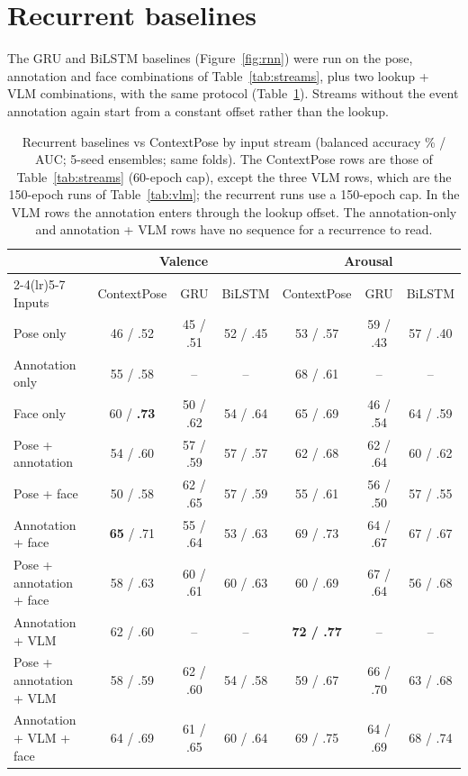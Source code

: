 \documentclass[11pt]{article}
\newcommand{\best}[1]{\textbf{#1}}
\begin{document}
\section{Recurrent baselines}\label{sec:baselines}

The GRU and BiLSTM baselines (Figure~\ref{fig:rnn}) were run on the pose, annotation and face combinations of Table~\ref{tab:streams}, plus two lookup + VLM combinations, with the same protocol (Table~\ref{tab:rnn}). Streams without the event annotation again start from a constant offset rather than the lookup.

\begin{table}[h]
\centering
\caption{Recurrent baselines vs ContextPose by input stream (balanced accuracy \% / AUC; 5-seed ensembles; same folds). The ContextPose rows are those of Table~\ref{tab:streams} (60-epoch cap), except the three VLM rows, which are the 150-epoch runs of Table~\ref{tab:vlm}; the recurrent runs use a 150-epoch cap. In the VLM rows the annotation enters through the lookup offset. The annotation-only and annotation + VLM rows have no sequence for a recurrence to read.}
\label{tab:rnn}
\small
\begin{tabular}{lcccccc}
\toprule
 & \multicolumn{3}{c}{Valence} & \multicolumn{3}{c}{Arousal} \\
\cmidrule(lr){2-4}\cmidrule(lr){5-7}
Inputs & ContextPose & GRU & BiLSTM & ContextPose & GRU & BiLSTM \\
\midrule
Pose only & 46 / .52 & 45 / .51 & 52 / .45 & 53 / .57 & 59 / .43 & 57 / .40 \\
Annotation only & 55 / .58 & -- & -- & 68 / .61 & -- & -- \\
Face only & 60 / \best{.73} & 50 / .62 & 54 / .64 & 65 / .69 & 46 / .54 & 64 / .59 \\
\midrule
Pose + annotation & 54 / .60 & 57 / .59 & 57 / .57 & 62 / .68 & 62 / .64 & 60 / .62 \\
Pose + face & 50 / .58 & 62 / .65 & 57 / .59 & 55 / .61 & 56 / .50 & 57 / .55 \\
Annotation + face & \best{65} / .71 & 55 / .64 & 53 / .63 & 69 / .73 & 64 / .67 & 67 / .67 \\
\midrule
Pose + annotation + face & 58 / .63 & 60 / .61 & 60 / .63 & 60 / .69 & 67 / .64 & 56 / .68 \\
\midrule
Annotation + VLM & 62 / .60 & -- & -- & \best{72 / .77} & -- & -- \\
Pose + annotation + VLM & 58 / .59 & 62 / .60 & 54 / .58 & 59 / .67 & 66 / .70 & 63 / .68 \\
Annotation + VLM + face & 64 / .69 & 61 / .65 & 60 / .64 & 69 / .75 & 64 / .69 & 68 / .74 \\
\bottomrule
\end{tabular}
\end{table}
\end{document}
